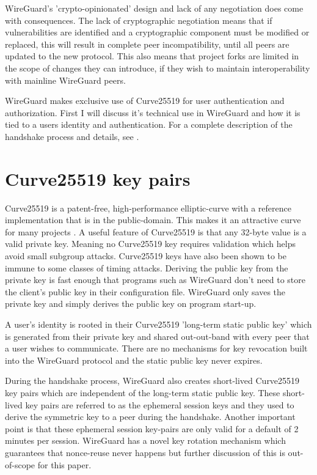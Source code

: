 \documentclass [11pt, proquest] {uwthesis}[2020/02/24]
\begin{document}
WireGuard's 'crypto-opinionated' design and lack of any negotiation does come with consequences. The lack of cryptographic negotiation means that if vulnerabilities are identified and a cryptographic component must be modified or replaced, this will result in complete peer incompatibility, until all peers are updated to the new protocol. 
This also means that project forks are limited in the scope of changes they can introduce, if they wish to maintain interoperability with mainline WireGuard peers.

WireGuard makes exclusive use of Curve25519 for user authentication and authorization. First I will discuss it's technical use in WireGuard and how it is tied to a users identity and authentication. For a complete description of the handshake process and details, see \cite{donenfeld_protocol_2018}\cite{donenfeld_wireguard_2017}.

\section{Curve25519 key pairs} \label{x25519}
Curve25519 is a patent-free, high-performance elliptic-curve with a reference implementation that is in the public-domain. This makes it an attractive curve for many projects \cite{noauthor_things_2022}.
A useful feature of Curve25519 is that any 32-byte value is a valid private key. Meaning no Curve25519 key requires validation which helps avoid small subgroup attacks. Curve25519 keys have also been shown to be immune to some classes of timing attacks\cite{noauthor_safecurves_2022}\cite{sasdrich_implementing_2015}.  Deriving the public key from the private key is fast enough that programs such as WireGuard don't need to store the client's public key in their configuration file. WireGuard only saves the private key and simply derives the public key on program start-up.

A user's identity is rooted in their Curve25519 'long-term static public key' which is generated from their private key and shared out-out-band with every peer that a user wishes to communicate.  
There are no mechanisms for key revocation built into the WireGuard protocol and the static public key never expires.

During the handshake process, WireGuard also creates short-lived Curve25519 key pairs which are independent of the long-term static public key. These short-lived key pairs are referred to as the ephemeral session keys and they used to derive the symmetric key to a peer during the handshake. 
Another important point is that these ephemeral session key-pairs are only valid for a default of 2 minutes per session. WireGuard has a novel key rotation mechanism which guarantees that nonce-reuse never happens but further discussion of this is out-of-scope for this paper. 
\end{document}

